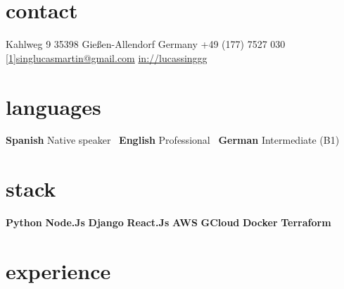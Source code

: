 \documentclass[a4paper,nocolors]{friggeri-cv}
\begin{document}


\begin{aside} %
\section{contact}
\pin \hfill Kahlweg 9
35398 Gießen-Allendorf
Germany\vspace{0.5em}
{\Large\textcolor{gray}{\Mobilefone}} \hfill +49 (177) 7527 030
\hfill \href{mailto:singlucasmartin@gmail.com}{\scalebox{0.9}[1]{singlucasmartin@gmail.com}}\vspace{0.75em}
\llogo \hfill \href{https://www.linkedin.com/in/lucassinggg}{in://lucassinggg}\vspace{2em}
\section{languages}
\textbf{Spanish} \hfill Native speaker~
\textbf{English} \hfill Professional~
\textbf{German} \hfill Intermediate (B1)~\vspace{2em}
\section{stack}
\textbf{Python} \hfill \filleddot \filleddot \filleddot \filleddot \emptydot
\textbf{Node.Js} \hfill \filleddot \filleddot \filleddot \emptydot \emptydot
\textbf{Django} \hfill \filleddot \filleddot \filleddot \filleddot \filleddot
\textbf{React.Js} \hfill \filleddot \filleddot \filleddot \emptydot \emptydot
\textbf{AWS} \hfill \filleddot \filleddot \filleddot \emptydot \emptydot
\textbf{GCloud} \hfill \filleddot \filleddot \filleddot \emptydot \emptydot
\textbf{Docker} \hfill \filleddot \filleddot \filleddot \filleddot \emptydot
\textbf{Terraform} \hfill \filleddot \emptydot \emptydot \emptydot \emptydot
\end{aside}

\section{experience}
\end{document}
